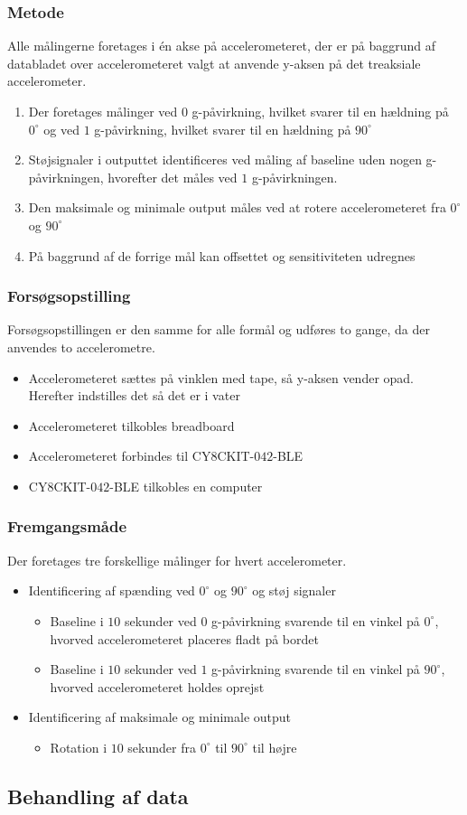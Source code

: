 \subsubsection{Metode}
Alle målingerne foretages i én akse på accelerometeret, der er på baggrund af databladet over accelerometeret valgt at anvende y-aksen på det treaksiale accelerometer. 
\begin{enumerate}
\item Der foretages målinger ved $0$ g-påvirkning, hvilket svarer til en hældning på $0^{\circ}$ og ved $1$ g-påvirkning, hvilket svarer til en hældning på $90^{\circ}$
\item Støjsignaler i outputtet identificeres ved måling af baseline uden nogen g-påvirkningen, hvorefter det måles ved $1$ g-påvirkningen. 
\item Den maksimale og minimale output måles ved at rotere accelerometeret fra $0^{\circ}$ og $90^{\circ}$
\item På baggrund af de forrige mål kan offsettet og sensitiviteten udregnes
\end{enumerate}

\subsubsection{Forsøgsopstilling}
Forsøgsopstillingen er den samme for alle formål og udføres to gange, da der anvendes to accelerometre.
\begin{itemize}
\item Accelerometeret sættes på vinklen med tape, så y-aksen vender opad. Herefter indstilles det så det er i vater
\item Accelerometeret tilkobles breadboard
\item Accelerometeret forbindes til CY$8$CKIT-$042$-BLE
\item CY$8$CKIT-$042$-BLE tilkobles en computer
\end{itemize}

\subsubsection{Fremgangsmåde}
Der foretages tre forskellige målinger for hvert accelerometer.
\begin{itemize}
\item Identificering af spænding ved $0^{\circ}$ og $90^{\circ}$ og støj signaler
\begin{itemize}
\item Baseline i $10$ sekunder ved $0$ g-påvirkning svarende til en vinkel på $0^{\circ}$, hvorved accelerometeret placeres fladt på bordet
\item Baseline i $10$ sekunder ved $1$ g-påvirkning svarende til en vinkel på $90^{\circ}$, hvorved accelerometeret holdes oprejst
\end{itemize}
\item Identificering af maksimale og minimale output 
\begin{itemize}
\item Rotation i $10$ sekunder fra $0^{\circ}$ til $90^{\circ}$ til højre
\end{itemize}
\end{itemize}


\subsection{Behandling af data}
